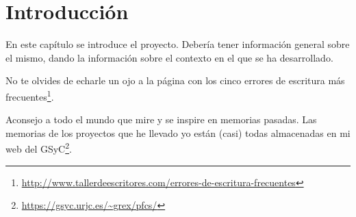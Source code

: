 \documentclass[a4paper, 12pt]{book}
\begin{document}




\tableofcontents 
\cleardoublepage
\listoffigures %
\cleardoublepage
\listoflistings


\cleardoublepage
\chapter{Introducción}
\label{sec:intro}

En este capítulo se introduce el proyecto.
Debería tener información general sobre el mismo, dando la información sobre el contexto en el que se ha desarrollado.

No te olvides de echarle un ojo a la página con los cinco errores de escritura más frecuentes\footnote{\url{http://www.tallerdeescritores.com/errores-de-escritura-frecuentes}}.

Aconsejo a todo el mundo que mire y se inspire en memorias pasadas.
Las memorias de los proyectos que he llevado yo están (casi) todas almacenadas en mi web del GSyC\footnote{\url{https://gsyc.urjc.es/~grex/pfcs/}}.
\end{document}
